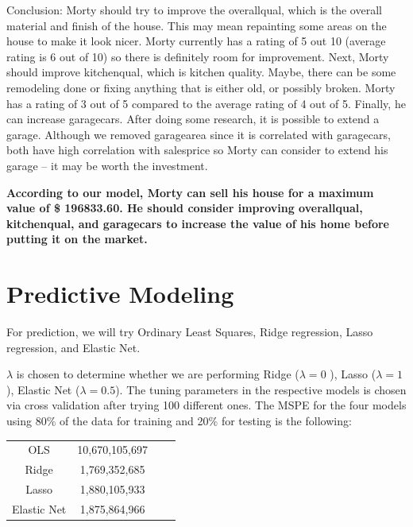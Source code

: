 \documentclass[12pt]{article}
\begin{document}
\begin{flushleft}
\begin{flushleft}
\begin{flushleft}
\begin{flushleft}
Conclusion: Morty should try to improve the overallqual, which is the overall material and finish of the house. This may mean repainting some areas on the house to make it look nicer. Morty currently has a rating of 5 out 10 (average rating is 6 out of 10) so there is definitely room for improvement. Next, Morty should improve kitchenqual, which is kitchen quality. Maybe, there can be some remodeling done or fixing anything that is either old, or possibly broken. Morty has a rating of 3 out of 5 compared to the average rating of 4 out of 5. Finally, he can increase garagecars. After doing some research, it is possible to extend a garage. Although we removed garagearea since it is correlated with garagecars, both have high correlation with salesprice so Morty can consider to extend his garage -- it may be worth the investment. 

\textbf{According to our model, Morty can sell his house for a maximum value of \$ 196833.60. He should consider improving overallqual, kitchenqual, and garagecars to increase the value of his home before putting it on the market.}

\end{flushleft}



\end{flushleft}

\section{Predictive Modeling}

\begin{flushleft}

For prediction, we will try Ordinary Least Squares, Ridge regression, Lasso regression, and Elastic Net. 

\begin{flushleft}

$\lambda$ is chosen to determine whether we are performing Ridge ($\lambda = 0$ ), Lasso ($\lambda = 1$), Elastic Net ($\lambda = 0.5$). The tuning parameters in the respective models is chosen via cross validation after trying 100 different ones. The MSPE for the four models using 80$\%$ of the data for training and 20$\%$ for testing is the following:
\end{flushleft}
\centering
\begin{tabular}{ |c|c|c|c|}
\hline
OLS & 10,670,105,697 \\
Ridge & 1,769,352,685 \\
Lasso & 1,880,105,933 \\
Elastic Net & 1,875,864,966 \\
\hline
\end{tabular}
\begin{flushleft}


\end{flushleft}
\end{flushleft}
\end{flushleft}
\end{flushleft}
\end{document}
